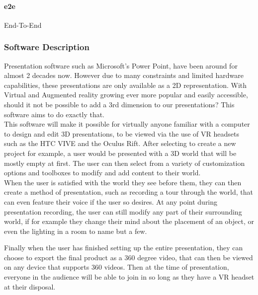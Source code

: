 \documentclass{article}
\begin{document}
			\paragraph{e2e} End-To-End



	\subsubsection{Software Description}

	Presentation software such as Microsoft's Power Point, have been around for almost 2 decades now.  However due to many constraints and limited hardware capabilities, these presentations are only available as a 2D representation. With Virtual and Augmented reality growing ever more popular and easily accessible, should it not be possible to add a 3rd dimension to our presentations? This software aims to do exactly that. \\

	This software will make it possible for virtually anyone familiar with a computer to design and edit 3D presentations, to be viewed via the use of VR headsets such as the HTC VIVE and the Oculus Rift. After selecting to create a new project for example, a user would be presented with a 3D world that will be mostly empty at first.  The user can then select from a variety of customization options and toolboxes to modify and add content to their world. \\

	When the user is satisfied with the world they see before them, they can then create a method of presentation, such as recording a tour through the world, that can even feature their voice if the user so desires.  At any point during presentation recording, the user can still modify any part of their surrounding world, if for example they change their mind about the placement of an object, or even the lighting in a room to name but a few.

	Finally when the user has finished setting up the entire presentation, they can choose to export the final product as a 360 degree video, that can then be viewed on any device that supports 360 videos.  Then at the time of presentation, everyone in the audience will be able to join in so long as they have a VR headset at their disposal.
\end{document}
